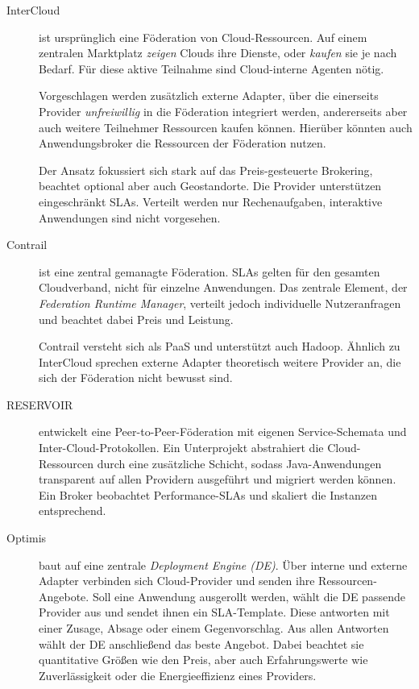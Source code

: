 \begin{description}	
	
	
	\item[InterCloud] ist ursprünglich eine Föderation von Cloud-Ressourcen. Auf einem zentralen Marktplatz \emph{zeigen} Clouds ihre Dienste, oder \emph{kaufen} sie je nach Bedarf. Für diese aktive Teilnahme sind Cloud-interne Agenten nötig.
	
	Vorgeschlagen werden zusätzlich externe Adapter, über die einerseits Provider \emph{unfreiwillig} in die Föderation integriert werden, andererseits aber auch weitere Teilnehmer Ressourcen kaufen können. Hierüber könnten auch Anwendungsbroker die Ressourcen der Föderation nutzen.
	
	Der Ansatz fokussiert sich stark auf das Preis-gesteuerte Brokering, beachtet optional aber auch Geostandorte. Die Provider unterstützen eingeschränkt SLAs. Verteilt werden nur Rechenaufgaben, interaktive Anwendungen sind nicht vorgesehen.
	
	
	\item[Contrail] ist eine zentral gemanagte Föderation. SLAs gelten für den gesamten Cloudverband, nicht für einzelne Anwendungen. Das zentrale Element, der \emph{Federation Runtime Manager}, verteilt jedoch individuelle Nutzeranfragen und beachtet dabei Preis und Leistung.
	

	Contrail versteht sich als PaaS und unterstützt auch Hadoop. Ähnlich zu InterCloud sprechen externe Adapter theoretisch weitere Provider an, die sich der Föderation nicht bewusst sind.
		
	
	\item[RESERVOIR] entwickelt eine Peer-to-Peer-Föderation mit eigenen Service-Schemata und Inter-Cloud-Protokollen. Ein Unterprojekt abstrahiert die Cloud-Ressourcen durch eine zusätzliche Schicht, sodass Java-Anwendungen transparent auf allen Providern ausgeführt und migriert werden können. Ein Broker beobachtet Performance-SLAs und skaliert die Instanzen entsprechend.
	
	
	\item[Optimis] baut auf eine zentrale \emph{Deployment Engine (DE)}. Über interne und externe Adapter verbinden sich Cloud-Provider und senden ihre Ressourcen-Angebote. Soll eine Anwendung ausgerollt werden, wählt die DE passende Provider aus und sendet ihnen ein SLA-Template. Diese antworten mit einer Zusage, Absage oder einem Gegenvorschlag. Aus allen Antworten wählt der DE anschließend das beste Angebot. Dabei beachtet sie quantitative Größen wie den Preis, aber auch Erfahrungswerte wie Zuverlässigkeit oder die Energieeffizienz eines Providers.
	

\end{description}
